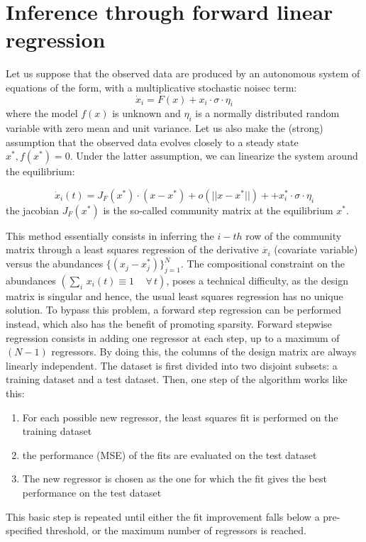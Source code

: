 \chapter{Inference through forward linear regression}
Let us suppose that the observed data are produced by an autonomous system of equations of the form, with a multiplicative stochastic noisec term:
\begin{equation*}
    \dot{x}_i = F(x) + x_i\cdot \sigma \cdot \eta_i
\end{equation*}
where the model $f(x)$ is unknown and $\eta_i$ is a normally distributed random variable with zero mean and unit variance. Let us also make the (strong) assumption that the observed data evolves closely to a steady state $x^{*}, f(x^{*}) = 0$. Under the latter assumption, we can linearize the system around the equilibrium:

\begin{equation*}
    \dot{x}_i(t) = J_{F}(x^{*})\cdot (x-x^*) + o(||x- x^*||) + + x_i^*\cdot \sigma \cdot \eta_i
\end{equation*}
the jacobian $J_{F}(x^{*})$ is the so-called community matrix at the equilibrium $x^*$.


This method essentially consists in inferring the $i- th$ row of the community matrix through a least squares regression of the derivative $\dot{x_i}$ (covariate variable) versus the abundances $\{(x_j - x_j^{*})\}_{j=1}^{N}$.
The compositional constraint on the abundances $(\sum_i\, x_i(t) \equiv 1 \,\quad \forall \,t)$, poses a technical difficulty, as the design matrix is singular and hence, the usual least squares regression has no unique solution. To bypass this problem, a forward step regression can be performed instead, which also has the benefit of promoting sparsity. Forward stepwise regression consists in adding one regressor at each step, up to a maximum of $(N-1)$ regressors. By doing this, the columns of the design matrix are always linearly independent. The dataset is first divided into two disjoint subsets: a training dataset and a test dataset. Then, one step of the algorithm works like this:
\begin{enumerate}
    \item For each possible new regressor, the least squares fit is performed on the training dataset
    \item the performance (MSE) of the fits are evaluated on the test dataset
    \item  The new regressor is chosen as the one for which the fit gives the best performance on the test dataset
\end{enumerate}
This basic step is repeated until either the fit improvement falls below a pre-specified threshold, or the maximum number of regressors is reached.


